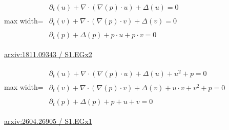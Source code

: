 \documentclass[10pt,a4paper]{article}
\begin{document}
\begin{minipage}{\linewidth}
\begin{center}\begin{adjustbox}{max width=\linewidth}$\displaystyle\begin{gathered}\begin{gathered}\partial_{t}(u)+\nabla\cdot(\nabla(p)\cdot u)+\Delta(u)=0\end{gathered}\\[5pt]\begin{gathered}\partial_{t}(v)+\nabla\cdot(\nabla(p)\cdot v)+\Delta(v)=0\end{gathered}\\[5pt]\begin{gathered}\partial_{t}(p)+\Delta(p)+p\cdot u+p\cdot v=0\end{gathered}\end{gathered}$\end{adjustbox}\end{center}
{\small \href{https://arxiv.org/html/1811.09343#S1.EGx2}{arxiv:1811.09343 / S1.EGx2}}\par
\end{minipage}\par\vspace{7mm}

\begin{minipage}{\linewidth}
\begin{center}\begin{adjustbox}{max width=\linewidth}$\displaystyle\begin{gathered}\begin{gathered}\partial_{t}(u)+\nabla\cdot(\nabla(p)\cdot u)+\Delta(u)+u^{2}+p=0\end{gathered}\\[5pt]\begin{gathered}\partial_{t}(v)+\nabla\cdot(\nabla(p)\cdot v)+\Delta(v)+u\cdot v+v^{2}+p=0\end{gathered}\\[5pt]\begin{gathered}\partial_{t}(p)+\Delta(p)+p+u+v=0\end{gathered}\end{gathered}$\end{adjustbox}\end{center}
{\small \href{https://arxiv.org/html/2604.26905#S1.EGx1}{arxiv:2604.26905 / S1.EGx1}}\par
\end{minipage}\par\vspace{7mm}
\end{document}
